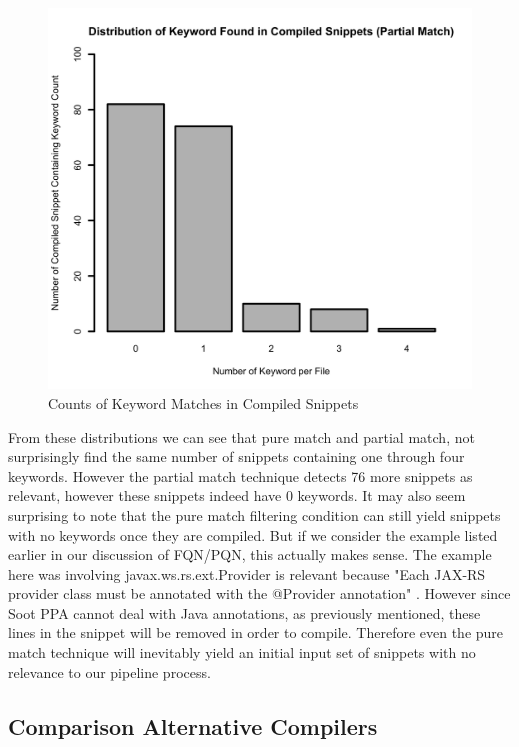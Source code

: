 \documentclass[10pt, conference]{IEEEtran}
\begin{document}
\begin{figure}[h]
\begin{center}
\includegraphics[width=0.9\linewidth]{CompiledKeywordDistPartialMatch.png}
\caption{Counts of Keyword Matches in Compiled Snippets}
\end{center}
\end{figure}

From these distributions we can see that pure match and partial match, not surprisingly find the same number of snippets containing one through four keywords. However the partial match technique detects 76 more snippets as relevant, however these snippets indeed have 0 keywords. It may also seem surprising to note that the pure match filtering condition can still yield snippets with no keywords once they are compiled. But if we consider the example listed earlier in our discussion of FQN/PQN, this actually makes sense. The example here was involving javax.ws.rs.ext.Provider is relevant because "Each JAX-RS provider class must be annotated with the @Provider annotation" \cite{jax.Provider}. However since Soot PPA cannot deal with Java annotations, as previously mentioned, these lines in the snippet will be removed in order to compile. Therefore even the pure match technique will inevitably yield an initial input set of snippets with no relevance to our pipeline process.

\subsection{Comparison Alternative Compilers}
\end{document}
